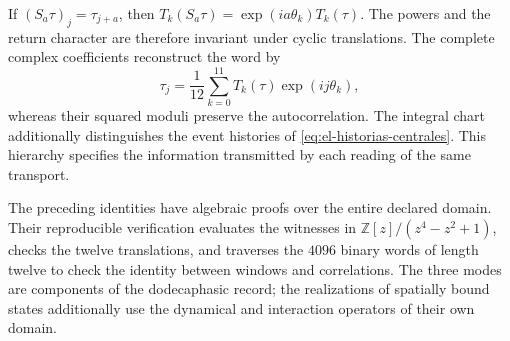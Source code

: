 If \((S_a\tau)_j=\tau_{j+a}\), then
\(T_k(S_a\tau)=\exp(ia\theta_k)T_k(\tau)\).
The powers and the return character are therefore invariant under
cyclic translations. The complete complex coefficients
reconstruct the word by
\[
 \tau_j=\frac1{12}\sum_{k=0}^{11}T_k(\tau)\exp(ij\theta_k),
\]
whereas their squared moduli preserve the autocorrelation.
The integral chart additionally distinguishes the event histories of
\eqref{eq:el-historias-centrales}. This hierarchy specifies the
information transmitted by each reading of the same transport.

The preceding identities have algebraic proofs over
the entire declared domain. Their reproducible verification evaluates the
witnesses in \(\mathbb Z[z]/(z^4-z^2+1)\), checks the twelve
translations, and traverses the \(4096\) binary words of length
twelve to check the identity between windows and correlations.
The three modes are components of the dodecaphasic record; the
realizations of spatially bound states additionally use
the dynamical and interaction operators of their own domain.

